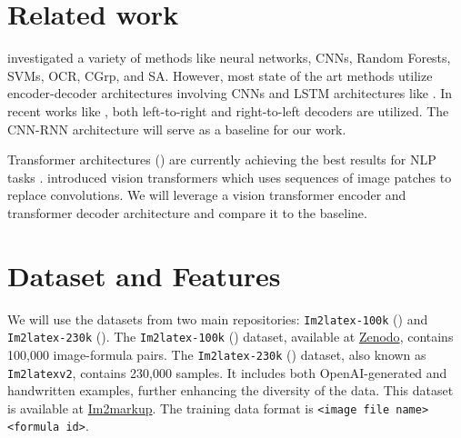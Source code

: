 \documentclass{article}
\begin{document}
\section{Related work}
\cite{schechter2017converting} investigated a variety of methods like neural networks, CNNs, Random Forests, SVMs, OCR, CGrp, and SA. However, most state of the art  methods utilize encoder-decoder architectures involving CNNs and LSTM architectures like \cite{genthial2016image}. In recent works like \cite{bian2022handwritten}, both left-to-right and right-to-left decoders are utilized. The CNN-RNN architecture will serve as a baseline for our work.

Transformer architectures (\cite{transformer}) are currently achieving the best results for NLP tasks . \cite{visiontransformer} introduced vision transformers which uses sequences of image patches to replace convolutions. We will leverage a vision transformer encoder and transformer decoder architecture and compare it to the baseline.

\section{Dataset and Features}

We will use the datasets from two main repositories: \texttt{Im2latex-100k} (\cite{kanervisto_2016_56198}) and \texttt{Im2latex-230k} (\cite{gervais2024mathwritingdatasethandwrittenmathematical}). The \texttt{Im2latex-100k} (\cite{kanervisto_2016_56198}) dataset, available at \href{https://zenodo.org/records/11230382}{Zenodo}, contains 100,000 image-formula pairs. The \texttt{Im2latex-230k} (\cite{gervais2024mathwritingdatasethandwrittenmathematical}) 
 dataset, also known as \texttt{Im2latexv2}, contains 230,000 samples. It includes both OpenAI-generated and handwritten examples, further enhancing the diversity of the data. This dataset is available at \href{https://im2markup.yuntiandeng.com/data/}{Im2markup}. The training data format is \texttt{<image file name> <formula id>}.
 
\end{document}
